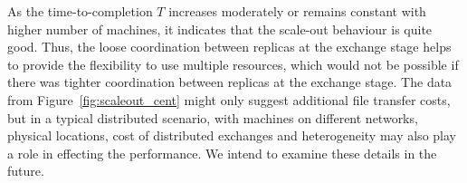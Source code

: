 \documentclass{rspublic}
\newcommand{\alnote}[1]{ {\textcolor{blue} { ***andre: #1 }}}
\newcommand{\alnote}[1]{}
\begin{document}
As the time-to-completion $T$ increases
moderately or remains constant with higher number of machines, it
indicates that the scale-out behaviour is quite good.  %
Thus, the loose coordination between replicas at the exchange stage helps to 
provide the flexibility to use multiple resources, which would not be possible if
there was tighter coordination between replicas at the exchange stage. The data from Figure~\ref{fig:scaleout_cent} might only suggest additional file transfer costs, but in a typical distributed scenario, with machines on different networks, physical locations, cost of distributed exchanges and heterogeneity may also play a role in effecting the performance. We intend to examine these details in the future.







\end{document}
